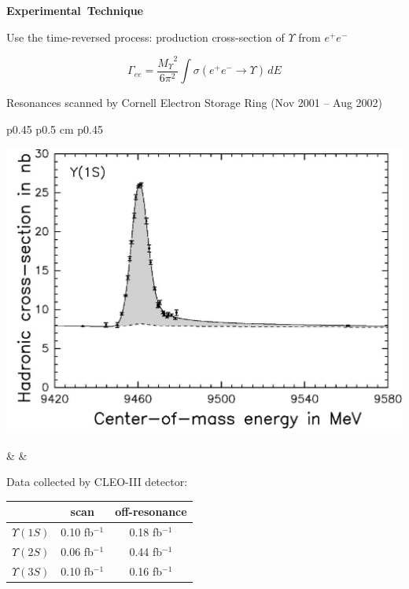 \documentclass[landscape]{article}
\newenvironment{slide}[1][ ]{\mbox{\bf #1 } \vfill}{\vfill \mbox{ } \pagebreak}
\begin{document}
\begin{slide}[Experimental Technique]

Use the time-reversed process: production cross-section of $\Upsilon$ from $e^+e^-$

\vspace{0.5 cm}

\[   \Gamma_{ee} = \frac{{M_\Upsilon}^2}{6\pi^2} \int \sigma(e^+e^- \to \Upsilon) \, dE \]

\vspace{1 cm}

Resonances scanned by Cornell Electron Storage Ring (Nov 2001 -- Aug 2002)

\vspace{0.5 cm}

\begin{center}
  \begin{tabular}{p{0.45\linewidth} p{0.5 cm} p{0.45\linewidth}}
    \begin{minipage}{\linewidth}
      \begin{center}
	\includegraphics[width=\linewidth]{prettied_individual07_noinset_1s}
      \end{center}
    \end{minipage} & &
    \begin{minipage}{\linewidth}
	Data collected by CLEO-III detector:

	\begin{center}
	  \renewcommand{\arraystretch}{1.25}
	  \begin{tabular}{c c c}
	    & scan & off-resonance \\\hline
	    $\Upsilon(1S)$ & 0.10 fb$^{-1}$ & 0.18 fb$^{-1}$ \\
	    $\Upsilon(2S)$ & 0.06 fb$^{-1}$ & 0.44 fb$^{-1}$ \\
	    $\Upsilon(3S)$ & 0.10 fb$^{-1}$ & 0.16 fb$^{-1}$ \\
	  \end{tabular}
	\end{center}
	\vspace{0.5 cm}


\end{minipage}
\end{tabular}
\end{center}
\end{slide}
\end{document}
